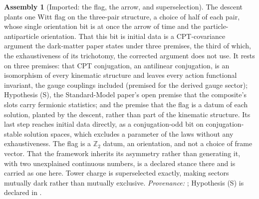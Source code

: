\documentclass[11pt]{article}
\theoremstyle{definition}
\newtheorem{assembled}[theorem]{Assembly}
\theoremstyle{plain}
\newcommand{\changedmark}[2]{\marginpar{\raggedright\scriptsize\color{#1}#2}}
\begin{document}
\begin{assembled}[Imported: the flag, the arrow, and superselection]\label{c:one-relation.imported-flag-arrow-superselection}
\changedmark{BrickRed}{corrected since the deposit}
The descent plants one Witt flag on the three-pair structure, a choice of half of each pair, whose single orientation bit is at once the arrow of time and the particle-antiparticle orientation. That this bit is initial data is a CPT-covariance argument the dark-matter paper states under three premises, the third of which, the exhaustiveness of its trichotomy, the corrected argument does not use. It rests on three premises: that CPT conjugation, an antilinear conjugation, is an isomorphism of every kinematic structure and leaves every action functional invariant, the gauge couplings included (premised for the derived gauge sector); Hypothesis (S), the Standard-Model paper's open premise that the composite's slots carry fermionic statistics; and the premise that the flag is a datum of each solution, planted by the descent, rather than part of the kinematic structure. Its last step reaches initial data directly, as a conjugation-odd bit on conjugation-stable solution spaces, which excludes a parameter of the laws without any exhaustiveness. The flag is a $\mathbb{Z}_{2}$ datum, an orientation, and not a choice of frame vector. That the framework inherits its asymmetry rather than generating it, with two unexplained continuous numbers, is a declared stance there and is carried as one here. Tower charge is superselected exactly, making sectors mutually dark rather than mutually exclusive. \emph{Provenance:} \cite[Def.~2.10, Prop.~4.1, Prop.~5.1 (stance), Prop.~5.2 (stated under three premises; the corrected argument replaces the exhaustiveness premise by the flag as a datum)]{ButlerT14}; Hypothesis (S) is declared in \cite[\S5]{ButlerT12}.
\end{assembled}
\end{document}
